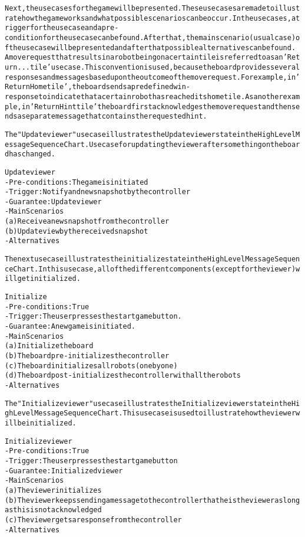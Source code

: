 \begin{alltt}
\rm
Next, the use cases for the game will be presented. These use cases are made to illustrate how the game works and what possible scenarios can be occur. In the use cases, a trigger for the use case and a pre-condition for the use case can be found. After that, the main scenario (usual case) of the use case will be presented and after that possible alternatives can be found. \\
A move request that results in a robot being on a certain tile is referred to as an 'Return ... tile' use case. This convention is used, because the board provides several responses and messages based upon the outcome of the move request. For example, in 'Return Home tile', the board sends a predefined win-response to indicate that a certain robot has reached its home tile. As another example, in 'Return Hint tile' the board first acknowledges the move request and then sends a separate message that contains the requested hint.

The "Update viewer" use case illustrates the Update viewer state in the High Level Message Sequence Chart. Use case for updating the viewer after something on the board has changed.

Update viewer
- Pre-conditions: The game is initiated
- Trigger: Notify and new snapshot by the controller
- Guarantee: Update viewer
- Main Scenarios
    (a) Receive a new snapshot from the controller
    (b) Update view by the received snapshot
- Alternatives

The next use case illustrates the initialize state in the High Level Message Sequence Chart. In this use case, all of the different components (except for the viewer) will get initialized.

Initialize
- Pre-conditions: True
- Trigger: The user presses the start game button.
- Guarantee: A new game is initiated.
- Main Scenarios
    (a) Initialize the board
    (b) The board pre-initializes the controller
    (c) The board initializes all robots (one by one)
    (d) The board post-initializes the controller with all the robots
- Alternatives

The "Initialize viewer" use case illustrates the Initialize viewer state in the High Level Message Sequence Chart. This use case is used to illustrate how the viewer will be initialized.

Initialize viewer
- Pre-conditions: True
- Trigger: The user presses the start game button
- Guarantee: Initialized viewer
- Main Scenarios
    (a) The viewer initializes
    (b) The viewer keeps sending a message to the controller that he is the viewer as long as this is not acknowledged
    (c) The viewer gets a response from the controller
- Alternatives


\end{alltt}

